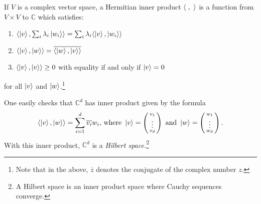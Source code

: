 \begin{definition}
If $V$ is a complex vector space, a Hermitian inner product $\langle\hspace{.1cm},\hspace{.1cm}\rangle$ is a function from $V \times V$ to $\mathbb{C}$ which satisfies: 

\begin{enumerate}
\item $\langle\ket{v}, \sum_i \lambda_i \ket{w_i}\rangle=\sum_i \lambda_i \langle\ket{v}, \ket{w_i}\rangle$
\item $\langle\ket{v}, \ket{w}\rangle=\overline{\langle\ket{w}, \ket{v}\rangle}$
\item $\langle\ket{v}, \ket{v}\rangle \ge 0$ \textrm{ with equality if and only if }$\ket{v}=0$
\end{enumerate}
for all $\ket{v}$ and $\ket{w}$.\footnote{Note that in the above, $\overline{z}$ denotes the conjugate of the complex number $z$.} 
\end{definition}

One easily checks that $\mathbb{C}^d$ has inner product given by the formula
\begin{equation} \label{inner product defn}
  \langle \ket{v},\ket{w}\rangle=\sum\limits_{i=1}^d \overline{v_i} w_i \textrm{, where }
  \ket{v}=\left(\begin{smallmatrix}v_1\\ \vdots\\v_d\end{smallmatrix}\right) \textrm{ and }\ket{w}=\left(\begin{smallmatrix}w_1\\ \vdots\\w_d\end{smallmatrix}\right).
\end{equation}
With this inner product, ${\mathbb{C}}^d$ is a \emph{Hilbert space.}\footnote{A Hilbert space is an inner product space where Cauchy sequences converge.}  

